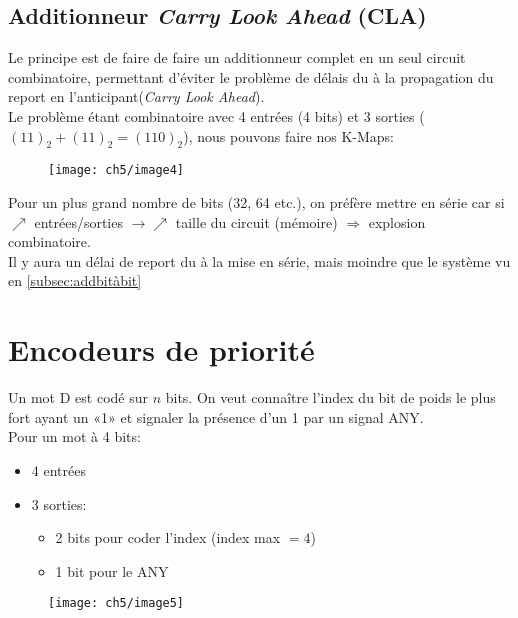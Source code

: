 \subsection{Additionneur \textit{Carry Look Ahead} (CLA)}
Le principe est de faire de faire un additionneur complet en un seul circuit combinatoire, permettant d'éviter le problème de délais du à la propagation du report en l'anticipant(\textit{Carry Look Ahead}).\\
Le problème étant combinatoire avec 4 entrées (4 bits) et 3 sorties ($(11)_2+(11)_2=(110)_2$), nous pouvons faire nos K-Maps:\\
\begin{figure}[H]
	\centering
	\texttt{[image: ch5/image4]}
\end{figure}
Pour un plus grand nombre de bits (32, 64 etc.), on préfère mettre en série car si $\nearrow$ entrées/sorties $\rightarrow \nearrow$ taille du circuit (mémoire) $\Rightarrow$ explosion combinatoire.\\
Il y aura un délai de report du à la mise en série, mais moindre que le système vu en \autoref{subsec:addbitàbit}
\section{Encodeurs de priorité}
Un mot D est codé sur $n$ bits. On veut connaître l'index du bit de poids le plus fort ayant un «1» et signaler la présence d'un 1 par un signal ANY.\\

Pour un mot à 4 bits:
\begin{itemize}
	\item 4 entrées
	\item 3 sorties:
	\begin{itemize}
		\item 2 bits pour coder l'index (index max $=4$) 
		\item 1 bit pour le ANY
	\end{itemize}
\end{itemize}
\begin{figure}[H]
	\centering
	\texttt{[image: ch5/image5]}
\end{figure}
